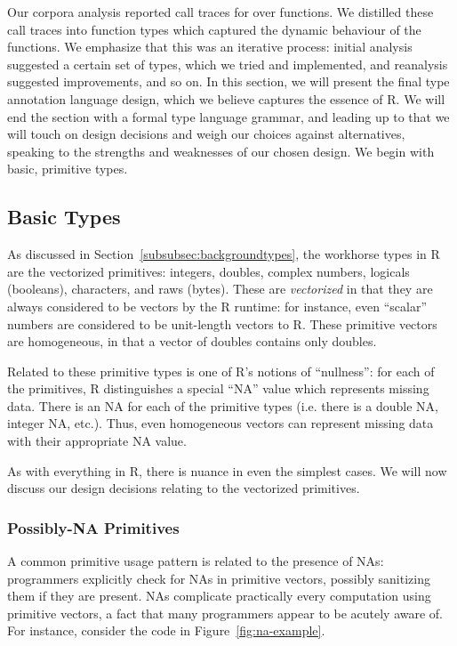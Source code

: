 \documentclass[acmsmall,review,anonymous]{acmart}\settopmatter{printfolios=true,printccs=false,printacmref=false}
\begin{document}
Our corpora analysis reported  call traces for over 
functions.  We distilled these call traces into function types which
captured the dynamic behaviour of the functions.  We emphasize that this was
an iterative process: initial analysis suggested a certain set of types,
which we tried and implemented, and reanalysis suggested improvements, and
so on.  In this section, we will present the final type annotation language
design, which we believe captures the essence of R.  We will end the section
with a formal type language grammar, and leading up to that we will touch on
design decisions and weigh our choices against alternatives, speaking to the
strengths and weaknesses of our chosen design.  We begin with basic,
primitive types.

%
%
%
%
\subsection{Basic Types}
\label{subsec:basictypes}

As discussed in Section~\ref{subsubsec:backgroundtypes}, the workhorse types
in R are the vectorized primitives: integers, doubles, complex numbers,
logicals (booleans), characters, and raws (bytes).  These are {\it
  vectorized} in that they are always considered to be vectors by the R
runtime: for instance, even ``scalar'' numbers are considered to be
unit-length vectors to R.  These primitive vectors are homogeneous, in that
a vector of doubles contains only doubles.

Related to these primitive types is one of R's notions of ``nullness'': for
each of the primitives, R distinguishes a special ``NA'' value which
represents missing data.  There is an NA for each of the primitive types
(i.e. there is a double NA, integer NA, etc.).  Thus, even homogeneous
vectors can represent missing data with their appropriate NA value.

As with everything in R, there is nuance in even the simplest cases.
We will now discuss our design decisions relating to the vectorized primitives.

%
%
\subsubsection{Possibly-NA Primitives}

A common primitive usage pattern is related to the presence of NAs:
programmers explicitly check for NAs in primitive vectors, possibly
sanitizing them if they are present.  NAs complicate practically every
computation using primitive vectors, a fact that many programmers appear to
be acutely aware of. For instance, consider the code in
Figure~\ref{fig:na-example}.
\end{document}
